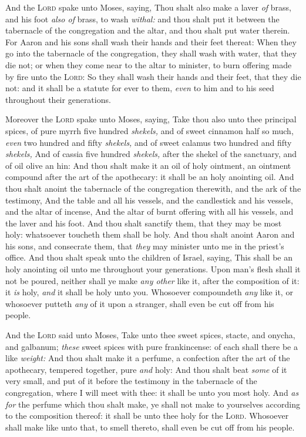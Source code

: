 \documentclass[11pt,letterpaper,oneside]{memoir}
\begin{document}
And the \textsc{Lord} spake unto Moses, saying, Thou shalt also make a
laver \emph{of} brass, and his foot \emph{also of} brass, to wash
\emph{withal:} and thou shalt put it between the tabernacle of the
congregation and the altar, and thou shalt put water therein. For Aaron
and his sons shall wash their hands and their feet thereat: When they go
into the tabernacle of the congregation, they shall wash with water,
that they die not; or when they come near to the altar to minister, to
burn offering made by fire unto the \textsc{Lord}: So they shall wash
their hands and their feet, that they die not: and it shall be a statute
for ever to them, \emph{even} to him and to his seed throughout their
generations.

Moreover the \textsc{Lord} spake unto Moses, saying, Take thou also unto
thee principal spices, of pure myrrh five hundred \emph{shekels,} and of
sweet cinnamon half so much, \emph{even} two hundred and fifty
\emph{shekels,} and of sweet calamus two hundred and fifty \emph{shekels,
}And of cassia five hundred \emph{shekels,} after the shekel of the
sanctuary, and of oil olive an hin: And thou shalt make it an oil of
holy ointment, an ointment compound after the art of the apothecary: it
shall be an holy anointing oil. And thou shalt anoint the tabernacle of
the congregation therewith, and the ark of the testimony, And the table
and all his vessels, and the candlestick and his vessels, and the altar
of incense, And the altar of burnt offering with all his vessels, and
the laver and his foot. And thou shalt sanctify them, that they may be
most holy: whatsoever toucheth them shall be holy. And thou shalt anoint
Aaron and his sons, and consecrate them, that \emph{they} may minister
unto me in the priest's office. And thou shalt speak unto the children
of Israel, saying, This shall be an holy anointing oil unto me
throughout your generations. Upon man's flesh shall it not be poured,
neither shall ye make \emph{any other} like it, after the composition of
it: it \emph{is} holy, \emph{and} it shall be holy unto you. Whosoever
compoundeth \emph{any} like it, or whosoever putteth \emph{any} of it
upon a stranger, shall even be cut off from his people.

And the \textsc{Lord} said unto Moses, Take unto thee sweet spices,
stacte, and onycha, and galbanum; \emph{these} sweet spices with pure
frankincense: of each shall there be a like \emph{weight: }And thou
shalt make it a perfume, a confection after the art of the apothecary,
tempered together, pure \emph{and} holy: And thou shalt beat \emph{some}
of it very small, and put of it before the testimony in the tabernacle
of the congregation, where I will meet with thee: it shall be unto you
most holy. And \emph{as for} the perfume which thou shalt make, ye shall
not make to yourselves according to the composition thereof: it shall be
unto thee holy for the \textsc{Lord}. Whosoever shall make like unto
that, to smell thereto, shall even be cut off from his people.
\end{document}
